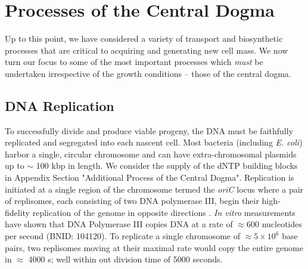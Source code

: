 \section{Processes of the Central Dogma}
Up to this point, we have considered a variety of transport and biosynthetic
processes that are critical to acquiring and generating new cell mass. We now
turn our focus to some of the most important processes which \textit{must} be
undertaken irrespective of the growth conditions -- those of the central dogma.


\subsection{DNA Replication}
To successfully divide and produce viable progeny, the DNA must be
faithfully replicated and segregated into each nascent cell. Most bacteria
(including \textit{E. coli}) harbor a single, circular chromosome and can have
extra-chromosomal plasmids up to $\sim$ 100 kbp in length. We consider the
supply of the dNTP building blocks in Appendix Section "Additional Process of
the Central Dogma". Replication is initiated at a single region of the
chromosome termed the \textit{oriC} locus where a pair of replisomes, each
consisting of two DNA polymerase III, begin their high-fidelity replication of
the genome in opposite directions \citep{fijalkowska2012}. \textit{In vitro}
measurements have shown that DNA Polymerase III copies DNA at a rate of $\approx
600$ nucleotides per second (BNID: 104120). To replicate a single chromosome of
$\approx 5\times 10^6$ base pairs, two replisomes moving at their maximal rate
would copy the entire genome in $\approx$ 4000 s; well within out division time
of 5000 seconds.



